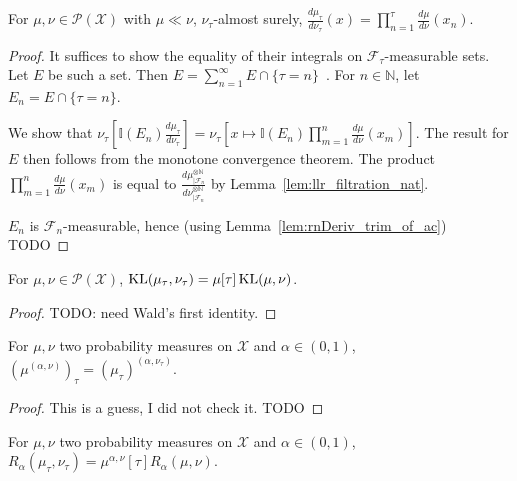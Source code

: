 \begin{lemma}
  \label{lem:llr_stopping_time}
  For $\mu, \nu \in \mathcal P(\mathcal X)$ with $\mu \ll \nu$, $\nu_\tau$-almost surely,
  $\frac{d \mu_\tau}{d \nu_\tau}(x) = \prod_{n=1}^\tau \frac{d \mu}{d \nu}(x_n)$.
\end{lemma}

\begin{proof}
It suffices to show the equality of their integrals on $\mathcal F_\tau$-measurable sets. Let $E$ be such a set.
Then $E = \sum_{n=1}^\infty E \cap \{\tau = n\}$~. For $n \in \mathbb{N}$, let $E_n = E \cap \{\tau = n\}$.

We show that $\nu_\tau \left[\mathbb{I}(E_n) \frac{d \mu_\tau}{d \nu_\tau}\right] = \nu_\tau\left[x \mapsto \mathbb{I}(E_n)\prod_{m=1}^n \frac{d \mu}{d \nu}(x_m)\right]$.
The result for $E$ then follows from the monotone convergence theorem.
The product $\prod_{m=1}^n \frac{d \mu}{d \nu}(x_m)$ is equal to $\frac{d \mu^{\otimes \mathbb{N}}_{| \mathcal F_n}}{d \nu^{\otimes \mathbb{N}}_{| \mathcal F_n}}$ by Lemma~\ref{lem:llr_filtration_nat}.

$E_n$ is $\mathcal F_n$-measurable, hence (using Lemma~\ref{lem:rnDeriv_trim_of_ac})
TODO

\end{proof}

\begin{theorem}
  \label{thm:kl_stopping_time}
  For $\mu, \nu \in \mathcal P(\mathcal X)$, $\operatorname{KL}(\mu_\tau, \nu_\tau) = \mu[\tau] \operatorname{KL}(\mu, \nu)$.
\end{theorem}

\begin{proof}
TODO: need Wald's first identity.
\end{proof}

\begin{lemma}
  \label{lem:renyiMeasure_stopping_time}
  For $\mu, \nu$ two probability measures on $\mathcal X$ and $\alpha \in (0,1)$, $(\mu^{(\alpha, \nu)})_\tau = (\mu_\tau)^{(\alpha, \nu_\tau)}$.
\end{lemma}

\begin{proof}
This is a guess, I did not check it. TODO
\end{proof}

\begin{theorem}
  \label{thm:renyi_stopping_time}
  For $\mu, \nu$ two probability measures on $\mathcal X$ and $\alpha \in (0,1)$,
  $R_\alpha(\mu_\tau, \nu_\tau) = \mu^{\alpha, \nu}[\tau] R_\alpha(\mu, \nu)$.
\end{theorem}

